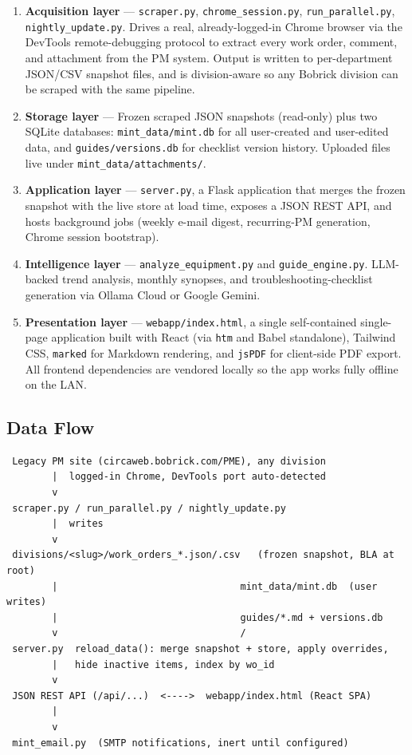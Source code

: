 \documentclass[11pt,a4paper]{article}
\newcommand{\code}[1]{\texttt{#1}}
\begin{document}
\begin{enumerate}
    \item \textbf{Acquisition layer} --- \code{scraper.py},
          \code{chrome\_session.py}, \code{run\_parallel.py},
          \code{nightly\_update.py}. Drives a real, already-logged-in Chrome
          browser via the DevTools remote-debugging protocol to extract
          every work order, comment, and attachment from the PM system.
          Output is written to per-department JSON/CSV snapshot files, and
          is division-aware so any Bobrick division can be scraped with the
          same pipeline.
    \item \textbf{Storage layer} --- Frozen scraped JSON snapshots
          (read-only) plus two SQLite databases: \code{mint\_data/mint.db}
          for all user-created and user-edited data, and
          \code{guides/versions.db} for checklist version history. Uploaded
          files live under \code{mint\_data/attachments/}.
    \item \textbf{Application layer} --- \code{server.py}, a Flask
          application that merges the frozen snapshot with the live store at
          load time, exposes a JSON REST API, and hosts background jobs
          (weekly e-mail digest, recurring-PM generation, Chrome session
          bootstrap).
    \item \textbf{Intelligence layer} --- \code{analyze\_equipment.py} and
          \code{guide\_engine.py}. LLM-backed trend analysis, monthly
          synopses, and troubleshooting-checklist generation via Ollama
          Cloud or Google Gemini.
    \item \textbf{Presentation layer} --- \code{webapp/index.html}, a single
          self-contained single-page application built with React (via
          \code{htm} and Babel standalone), Tailwind CSS, \code{marked} for
          Markdown rendering, and \code{jsPDF} for client-side PDF export.
          All frontend dependencies are vendored locally so the app works
          fully offline on the LAN.
\end{enumerate}

\subsection{Data Flow}
\begin{lstlisting}
 Legacy PM site (circaweb.bobrick.com/PME), any division
        |  logged-in Chrome, DevTools port auto-detected
        v
 scraper.py / run_parallel.py / nightly_update.py
        |  writes
        v
 divisions/<slug>/work_orders_*.json/.csv   (frozen snapshot, BLA at root)
        |                                mint_data/mint.db  (user writes)
        |                                guides/*.md + versions.db
        v                                /
 server.py  reload_data(): merge snapshot + store, apply overrides,
        |   hide inactive items, index by wo_id
        v
 JSON REST API (/api/...)  <---->  webapp/index.html (React SPA)
        |
        v
 mint_email.py  (SMTP notifications, inert until configured)
\end{lstlisting}
\end{document}
